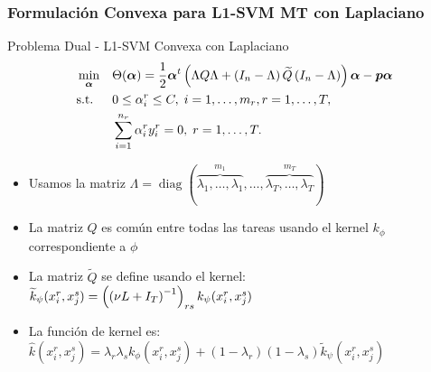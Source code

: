 \documentclass[aspectratio=43]{beamer}
\DeclareMathOperator{\Diag}{diag}
\newcommand{\upper}[1]{\expandafter\MakeUppercase\expandafter{#1}}
\newcommand{\mymat}[1]{\upper{#1}}
\newcommand{\myvec}[1]{\bm{#1}}
\newcommand{\fv}[1]{\myvec{#1}}
\newcommand{\fm}[1]{\mymat{#1}}
\newcommand{\nsamples}{n}
\newcommand{\ntasks}{T}
\newcommand{\npertask}{m}
\begin{document}
\begin{frame}
      \frametitle{Formulación Convexa para L1-SVM MT con Laplaciano}
  
      \begin{block}{Problema Dual - L1-SVM Convexa con Laplaciano}
            \begin{equation}\nonumber%
                  \begin{aligned}
                       & \min_{\fv{\alpha}}
                       &                       & \Theta(\fv{\alpha}) = \frac{1}{2} \fv{\alpha}^t \left( \Lambda \fm{Q} \Lambda + \left(\fm{I}_{\nsamples} - \Lambda \right) \fm{\widetilde{Q}} \left(\fm{I}_{\nsamples} - \Lambda \right) \right) \fv{\alpha} - \fv{p} \fv{\alpha}                                                             \\
                       & \text{s.t.}
                       &                       & 0 \leq \alpha_i^r \leq C, \;  i=1,\ldots,m_r, r=1,\ldots,T ,                                                                                                                                                                                                                                  \\
                       &                       &                                                                                                                                                                                                                                   & \sum_{i=1}^{n_r}{\alpha_i^r y_i^r} = 0, \; r=1,\ldots,T .
                  \end{aligned}
              \end{equation}
      \end{block}
      \begin{itemize}
            \item Usamos la matriz $  \Lambda = \Diag(\overbrace{\lambda_1, \ldots, \lambda_1}^{\npertask_1}, \ldots, \overbrace{\lambda_\ntasks, \ldots, \lambda_\ntasks}^{\npertask_\ntasks}) $
            \item La matriz $Q$ es común entre todas las tareas usando el kernel $k_\phi$ correspondiente a $\phi$
            \item La matriz $\tilde{Q}$ se define usando el kernel: $\widetilde{k}_\psi(x_i^r, x_j^s) = \left( \left(\nu \fm{L} + \fm{I}_\ntasks\right)^{-1} \right)_{rs} k_\psi(x_i^r, x_j^s) $
            \item La función de kernel es: 
            $    \widehat{k}({x}_i^r, {x}_j^s) = \lambda_r \lambda_s k_\phi({x}_i^r, {x}_j^s) +  (1-\lambda_r) (1 - \lambda_s) \widetilde{k}_\psi({x}_i^r, {x}_j^s) 
            $
      \end{itemize}

\end{frame}
\end{document}

